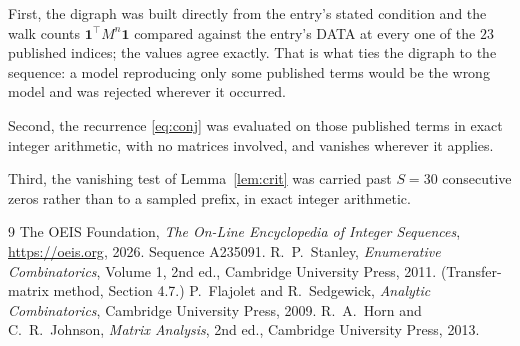 \documentclass[11pt,a4paper]{article}
\theoremstyle{plain}
\theoremstyle{definition}
\begin{document}
First, the digraph was built directly from the entry's stated condition and the walk counts
$\mathbf{1}^{\!\top}M^{n}\mathbf{1}$ compared against the entry's DATA at every one of
the $23$ published indices; the values agree exactly. That is what ties the digraph to
the sequence: a model reproducing only some published terms would be the wrong model and
was rejected wherever it occurred.

Second, the recurrence \eqref{eq:conj} was evaluated on those published terms in exact
integer arithmetic, with no matrices involved, and vanishes wherever it applies.

Third, the vanishing test of Lemma~\ref{lem:crit} was carried past $S=30$ consecutive
zeros rather than to a sampled prefix, in exact integer arithmetic.

\begin{thebibliography}{9}
 The OEIS Foundation, \emph{The On-Line Encyclopedia of Integer
Sequences}, \url{https://oeis.org}, 2026. Sequence A235091.
 R.~P.~Stanley, \emph{Enumerative Combinatorics}, Volume 1, 2nd ed.,
Cambridge University Press, 2011. (Transfer-matrix method, Section 4.7.)
 P.~Flajolet and R.~Sedgewick, \emph{Analytic Combinatorics}, Cambridge
University Press, 2009.
 R.~A.~Horn and C.~R.~Johnson, \emph{Matrix Analysis}, 2nd ed., Cambridge
University Press, 2013.
\end{thebibliography}
\end{document}
